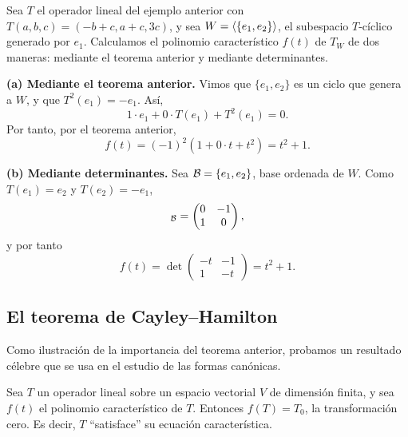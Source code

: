 \documentclass[12pt,a4paper]{book}
\begin{document}
    \begin{ejemplo}
        Sea $T$ el operador lineal del ejemplo anterior con $T(a,b,c)=(-b+c,a+c,3c)$, y sea $W=\langle \{e_1,e_2\} \rangle$, el subespacio $T$-cíclico generado por $e_1$. Calculamos el polinomio característico $f(t)$ de $T_W$ de dos maneras: mediante el teorema anterior y mediante determinantes.

        \textbf{(a) Mediante el teorema anterior.} Vimos que $\{e_1,e_2\}$ es un ciclo que genera a $W$, y que $T^2(e_1)=-e_1$. Así,
        \begin{equation*}
            1\cdot e_1+0\cdot T(e_1)+T^2(e_1)=0.
        \end{equation*}
        Por tanto, por el teorema anterior,
        \begin{equation*}
            f(t)=(-1)^2(1+0\cdot t+t^2)=t^2+1.
        \end{equation*}

        \textbf{(b) Mediante determinantes.} Sea $\mathcal{B}=\{e_1,e_2\}$, base ordenada de $W$. Como $T(e_1)=e_2$ y $T(e_2)=-e_1$,
        \begin{equation*}
            [T_W]_{\BB}=\begin{pmatrix}0&-1\\1&0\end{pmatrix},
        \end{equation*}
        y por tanto
        \begin{equation*}
            f(t)=\det\begin{pmatrix}-t&-1\\1&-t\end{pmatrix}=t^2+1.
        \end{equation*}
    \end{ejemplo}

    \subsection*{El teorema de Cayley--Hamilton}

    Como ilustración de la importancia del teorema anterior, probamos un resultado célebre que se usa en el estudio de las formas canónicas.

    \begin{teorema}
        Sea $T$ un operador lineal sobre un espacio vectorial $V$ de dimensión finita, y sea $f(t)$ el polinomio característico de $T$. Entonces $f(T)=T_0$, la transformación cero. Es decir, $T$ ``satisface'' su ecuación característica.
    \end{teorema}
\end{document}
